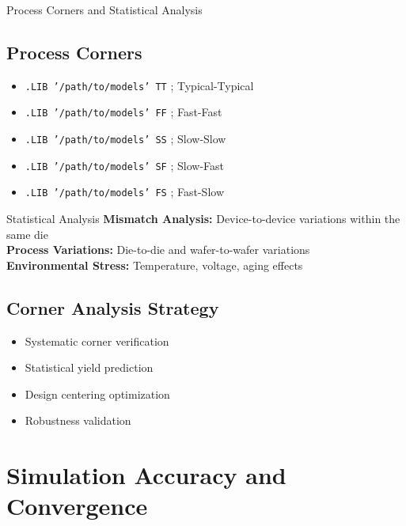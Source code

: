 \documentclass{beamer}
\begin{document}
\begin{frame}{Process Corners and Statistical Analysis}
    \subsection{Process Corners}
    \begin{itemize}
        \item \texttt{.LIB '/path/to/models' TT} ; Typical-Typical
        \item \texttt{.LIB '/path/to/models' FF} ; Fast-Fast
        \item \texttt{.LIB '/path/to/models' SS} ; Slow-Slow
        \item \texttt{.LIB '/path/to/models' SF} ; Slow-Fast
        \item \texttt{.LIB '/path/to/models' FS} ; Fast-Slow
    \end{itemize}
    
    \begin{alertblock}{Statistical Analysis}
        \textbf{Mismatch Analysis:} Device-to-device variations within the same die \\
        \textbf{Process Variations:} Die-to-die and wafer-to-wafer variations \\
        \textbf{Environmental Stress:} Temperature, voltage, aging effects
    \end{alertblock}
    
    \subsection{Corner Analysis Strategy}
    \begin{itemize}
        \item Systematic corner verification
        \item Statistical yield prediction
        \item Design centering optimization
        \item Robustness validation
    \end{itemize}
\end{frame}

\section{Simulation Accuracy and Convergence}
\end{document}

